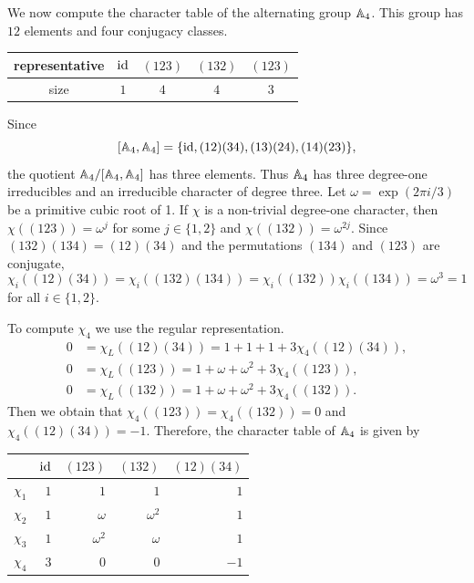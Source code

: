 \begin{example}
	We now compute the character table of the alternating group $\mathbb{A}_4$. This group has $12$ 
	elements and four conjugacy classes.
	\begin{center}
		\begin{tabular}{c|cccc}
			representative & $\operatorname{id}$ & $(123)$ & $(132)$ & $(123)$\tabularnewline
			\hline
			size & $1$ & $4$ & $4$ & $3$ 
		\end{tabular}
	\end{center}
	Since 
 \[
 [\mathbb{A}_4,\mathbb{A}_4]=\{\operatorname{id},(12)(34),(13)(24),(14)(23)\},
 \]
	the quotient $\mathbb{A}_4/[\mathbb{A}_4,\mathbb{A}_4]$ has three elements. Thus $\mathbb{A}_4$ has three degree-one irreducibles and
	an irreducible character of degree three. Let 
	$\omega=\exp(2\pi i/3)$ be a primitive cubic root of 1. If $\chi$
	is a non-trivial degree-one character, then 
	$\chi\left( (123) \right)=\omega^j$
	for some $j\in\{1,2\}$ and $\chi\left( (132) \right)=\omega^{2j}$. Since 
	$(132)(134)=(12)(34)$ and 
	the permutations $(134)$ and $(123)$ are conjugate,  
	\[
	\chi_i((12)(34))=\chi_i((132)(134))=\chi_i((132))\chi_i((134))=\omega^3=1
	\]
	for all $i\in\{1,2\}$. 
	
	To compute $\chi_4$ we use the regular representation. 
	\begin{align*}
		0&=\chi_L\left( (12)(34) \right)=1+1+1+3\chi_4\left( (12)(34) \right),\\
		0&=\chi_L\left( (123) \right)=1+\omega+\omega^2+3\chi_4\left( (123) \right),\\
		0&=\chi_L\left( (132) \right)=1+\omega+\omega^2+3\chi_4\left( (132) \right).
	\end{align*}
	Then we obtain that $\chi_4\left( (123) \right)=\chi_4\left( (132)
	\right)=0$ and $\chi_4\left( (12)(34) \right)=-1$. Therefore, the character table of $\mathbb{A}_4$
	is given by
	\begin{center}
		\begin{tabular}{|c|rrrr|}
			\hline
			& $\operatorname{id}$ & $(123)$ & $(132)$ & $(12)(34)$\tabularnewline
			\hline
			$\chi_1$ & $1$ & $1$ & $1$ & $1$\tabularnewline
			$\chi_2$ & $1$ & $\omega$ & $\omega^2$ & $1$\tabularnewline
			$\chi_3$ & $1$ & $\omega^2$ & $\omega$ & $1$\tabularnewline
			$\chi_4$ & $3$ & $0$ & $0$ & $-1$\tabularnewline
			\hline
		\end{tabular}
	\end{center}


\end{example}
